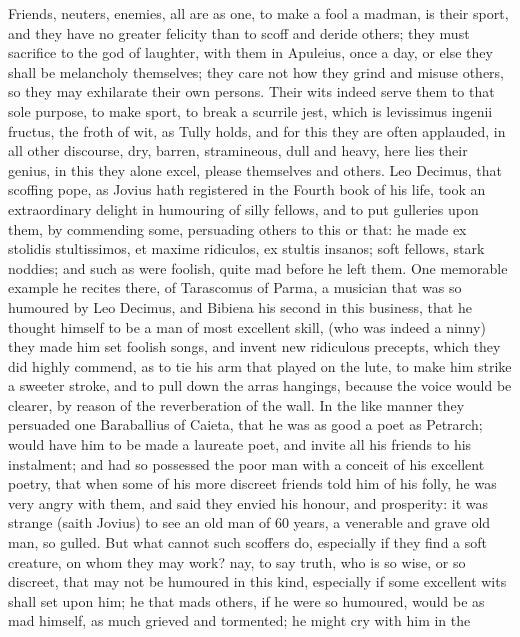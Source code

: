 {Friends, neuters, enemies, all are as one, to make a fool a madman, is
their sport, and they have no greater felicity than to scoff and deride
others; they must sacrifice to the god of laughter, with them in 
Apuleius, once a day, or else they shall be melancholy themselves; they
care not how they grind and misuse others, so they may exhilarate their
own persons. Their wits indeed serve them to that sole purpose, to make
sport, to break a scurrile jest, which is levissimus ingenii fructus,
the froth of wit, as Tully holds, and for this they are often
applauded, in all other discourse, dry, barren, stramineous, dull and
heavy, here lies their genius, in this they alone excel, please
themselves and others. Leo Decimus, that scoffing pope, as Jovius hath
registered in the Fourth book of his life, took an extraordinary
delight in humouring of silly fellows, and to put gulleries upon them,
by commending some, persuading others to this or that: he made ex
stolidis stultissimos, et maxime ridiculos, ex stultis insanos; soft
fellows, stark noddies; and such as were foolish, quite mad before he
left them. One memorable example he recites there, of Tarascomus of
Parma, a musician that was so humoured by Leo Decimus, and Bibiena his
second in this business, that he thought himself to be a man of most
excellent skill, (who was indeed a ninny) they made him set
foolish songs, and invent new ridiculous precepts, which they did
highly commend, as to tie his arm that played on the lute, to make him
strike a sweeter stroke, and to pull down the arras hangings,
because the voice would be clearer, by reason of the reverberation of
the wall. In the like manner they persuaded one Baraballius of Caieta,
that he was as good a poet as Petrarch; would have him to be made a
laureate poet, and invite all his friends to his instalment; and had so
possessed the poor man with a conceit of his excellent poetry, that
when some of his more discreet friends told him of his folly, he was
very angry with them, and said they envied his honour, and
prosperity: it was strange (saith Jovius) to see an old man of 60
years, a venerable and grave old man, so gulled. But what cannot such
scoffers do, especially if they find a soft creature, on whom they may
work? nay, to say truth, who is so wise, or so discreet, that may not
be humoured in this kind, especially if some excellent wits shall set
upon him; he that mads others, if he were so humoured, would be as mad
himself, as much grieved and tormented; he might cry with him in the
}
